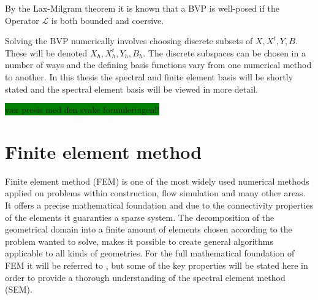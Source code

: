 By the Lax-Milgram theorem it is known that a BVP is well-posed if the Operator $\mathcal{L}$ is both bounded and coersive.   

Solving the BVP numerically involves choosing discrete subsets of $X,X^t,Y,B$. These will be denoted $X_h,X_h^t,Y_h,B_h$.
The discrete subspaces can be chosen in a number of ways and the defining basis functions vary from one numerical method to another. 
In this thesis the spectral and finite element basis will be shortly stated and the spectral element basis will be viewed in more detail.


\colorbox{green}{vær presis med den svake formuleringen!!}
\section{Finite element method}

Finite element method (FEM) is one of the most widely used numerical methods applied on problems within construction, flow simulation and many 
other areas. It offers a precise mathematical foundation and due to the connectivity properties of the elements 
it guaranties a sparse system. The decomposition of the geometrical domain into a finite amount of elements chosen according to the problem 
wanted to solve, makes it possible to create general algorithms applicable to all kinds of geometries. 
For the full mathematical foundation of FEM it will be referred to \cite{Quarteroni}, but some of the key properties will be stated here
in order to provide a thorough understanding of the spectral element method (SEM). 

